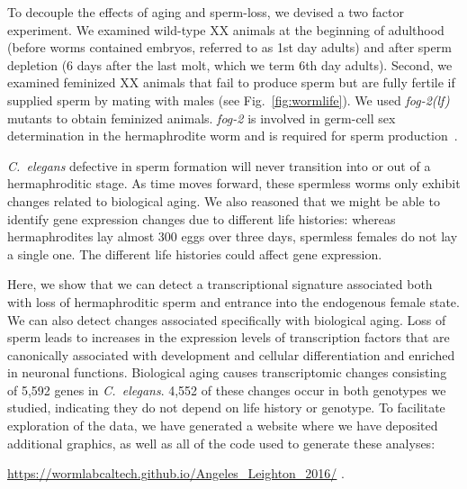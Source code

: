 \documentclass[9pt,twocolumn,twoside]{gsajnl}
\newcommand{\cel}{\emph{C.~elegans}}
\newcommand{\fog}{\emph{\mbox{fog-2(lf)}}}
\newcommand{\gene}[1]{\emph{\mbox{#1}}}
\newcommand{\agen}{5,592}
\newcommand{\website}{
            \url{https://wormlabcaltech.github.io/Angeles_Leighton_2016/}
            }
\begin{document}
To decouple the effects of aging and sperm-loss, we devised a two factor
experiment. We examined wild-type XX animals at the beginning of
adulthood (before worms contained embryos, referred to as 1st day adults) and
after sperm depletion (6 days after the last molt, which we term 6th day
adults). Second, we examined feminized XX animals that fail to produce sperm but
are fully fertile if supplied sperm by mating with males (see
Fig.~\ref{fig:wormlife}). We used \fog{} mutants to obtain feminized animals.
\gene{fog-2} is involved in germ-cell sex determination in the hermaphrodite
worm and is required for sperm production~\citep{Schedl1988,Clifford2000}.

\cel{} defective in sperm formation will never transition into or out of a
hermaphroditic stage. As time moves forward, these spermless worms only exhibit
changes related to biological aging. We also reasoned that we might be able to
identify gene expression changes due to different life histories: whereas
hermaphrodites lay almost 300 eggs over three days, spermless females do not lay
a single one. The different life histories could affect gene expression.

Here, we show that we can detect a transcriptional signature associated both
with loss of hermaphroditic sperm and entrance into the endogenous female state.
We can also detect changes associated specifically with biological aging.
Loss of sperm leads to increases in the expression levels of transcription
factors that are canonically associated with development and cellular
differentiation and enriched in neuronal functions.
Biological aging causes transcriptomic changes consisting of \agen{} genes
in \cel{}. 4,552 of these changes occur in both genotypes we studied,
indicating they do not depend on life history or genotype. To facilitate
exploration of the data, we have generated a website where we have deposited
additional graphics, as well as all of the code used to generate these analyses:
\website{}.
\end{document}
